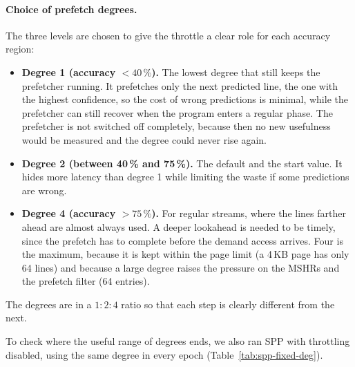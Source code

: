 \documentclass[11pt,a4paper]{article}
\begin{document}
\paragraph{Choice of prefetch degrees.}
The three levels are chosen to give the throttle a clear role for each accuracy region:
\begin{itemize}
    \item \textbf{Degree 1 (accuracy $<40\,\%$).} The lowest degree that still keeps the prefetcher
          running. It prefetches only the next predicted line, the one with the highest confidence,
          so the cost of wrong predictions is minimal, while the prefetcher can still recover when
          the program enters a regular phase. The prefetcher is not switched off completely, because
          then no new usefulness would be measured and the degree could never rise again.
    \item \textbf{Degree 2 (between 40\,\% and 75\,\%).} The default and the start value. It hides
          more latency than degree 1 while limiting the waste if some predictions are wrong.
    \item \textbf{Degree 4 (accuracy $>75\,\%$).} For regular streams, where the lines farther
          ahead are almost always used. A deeper lookahead is needed to be timely, since the
          prefetch has to complete before the demand access arrives. Four is the maximum, because
          it is kept within the page limit (a 4\,KB page has only 64 lines) and because a large
          degree raises the pressure on the MSHRs and the prefetch filter (64 entries).
\end{itemize}
The degrees are in a $1:2:4$ ratio so that each step is clearly different from the next.

To check where the useful range of degrees ends, we also ran SPP with throttling disabled, using
the same degree in every epoch (Table~\ref{tab:spp-fixed-deg}).
\end{document}
